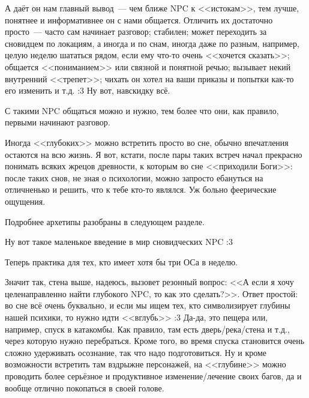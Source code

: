 \documentclass[a4paper,14pt,oneside]{memoir}
\begin{document}
А даёт он нам главный вывод~--- чем ближе NPC к <<истокам>>, тем лучше, понятнее и информативнее он с нами общается. Отличить их достаточно просто~--- часто сам начинает разговор; стабилен; может переходить за сновидцем по локациям, а иногда и по снам, иногда даже по разным, например, целую неделю шататься рядом, если ему что-то очень <<хочется сказать>>; общается <<пониманием>> или связной и понятной речью; вызывает некий внутренний <<трепет>>; чихать он хотел на ваши приказы и попытки как-то его изменить и т.д. :3 Ну вот, навскидку всё.

С такими NPC общаться можно и нужно, тем более что они, как правило, первыми начинают разговор. 

Иногда <<глубоких>> можно встретить просто во сне, обычно впечатления остаются на всю жизнь. Я вот, кстати, после пары таких встреч начал прекрасно понимать всяких жрецов древности, к которым во сне <<приходили Боги>>: после таких снов, не зная о психологии, можно запросто ебануться на отличненько и решить, что к тебе кто-то являлся. Уж больно феерические ощущения.

Подробнее архетипы разобраны в следующем разделе.

Ну вот такое маленькое введение в мир сновидческих NPC :3 

Теперь практика для тех, кто имеет хотя бы три ОСа в неделю.

Значит так, стена выше, надеюсь, вызовет резонный вопрос: <<А если я хочу целенаправленно найти глубокого NPC, то как это сделать?>>. Ответ простой: во сне всё очень буквально, и если мы ищем тех, кто символизирует глубины нашей психики, то нужно идти <<вглубь>> :3 Да-да, это пещера или, например, спуск в катакомбы. Как правило, там есть дверь/река/стена и т.д., через которую нужно перебраться. Кроме того, во время спуска становится очень сложно удерживать осознание, так что надо подготовиться. Ну и кроме возможности встретить там вздрыжне персонажей, на <<глубине>> можно проводить более серьёзное и продуктивное изменение/лечение своих багов, да и вообще отлично покопаться в своей голове. 
\end{document}
